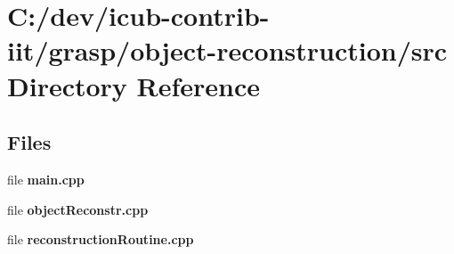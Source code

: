 \section{C\+:/dev/icub-\/contrib-\/iit/grasp/object-\/reconstruction/src Directory Reference}
\label{dir_b6dfd752f58c36a18e052c8ce1474b27}
\subsection*{Files}
\begin{DoxyCompactItemize}
\item 
file {\bfseries main.\+cpp}
\item 
file {\bfseries object\+Reconstr.\+cpp}
\item 
file {\bfseries reconstruction\+Routine.\+cpp}
\end{DoxyCompactItemize}
